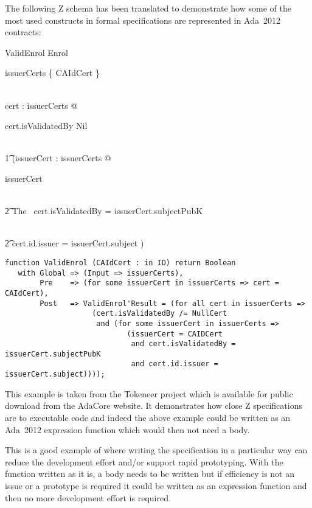 \documentclass{llncs}
\newcommand{\adatwtw}{Ada~2012\xspace}
\begin{document}
The following Z schema has been translated to demonstrate how some of
the most used constructs in formal specifications are represented in
\adatwtw contracts:

\begin{schema}{ValidEnrol}
Enrol\\ \where

        issuerCerts \cap \{ CAIdCert \} \neq \emptyset

\also

\\ \forall cert : issuerCerts @

           cert.isValidatedBy \neq Nil

\\ \t1 \land (\exists issuerCert : issuerCerts @

        issuerCert 

\\ \t2 \land The \ cert.isValidatedBy = issuerCert.subjectPubK

\\ \t2 \land cert.id.issuer = issuerCert.subject )

\end{schema}

\begin{lstlisting}[language=SPARK]
function ValidEnrol (CAIdCert : in ID) return Boolean
   with Global => (Input => issuerCerts),
        Pre    => (for some issuerCert in issuerCerts => cert = CAIdCert),
        Post   => ValidEnrol'Result = (for all cert in issuerCerts =>
                    (cert.isValidatedBy /= NullCert
                     and (for some issuerCert in issuerCerts =>
                            (issuerCert = CAIDCert
                             and cert.isValidatedBy = issuerCert.subjectPubK
                             and cert.id.issuer = issuerCert.subject))));
\end{lstlisting}

This example is taken from the Tokeneer project which is available for
public download from the AdaCore website. It demonstrates how close Z
specifications are to executable code and indeed the above example
could be written as an \adatwtw expression function which would then
not need a body.

This is a good example of where writing the specification in a
particular way can reduce the development effort and/or support rapid
prototyping. With the function written as it is, a body needs to be
written but if efficiency is not an issue or a prototype is required
it could be written as an expression function and then no more
development effort is required.
\end{document}
